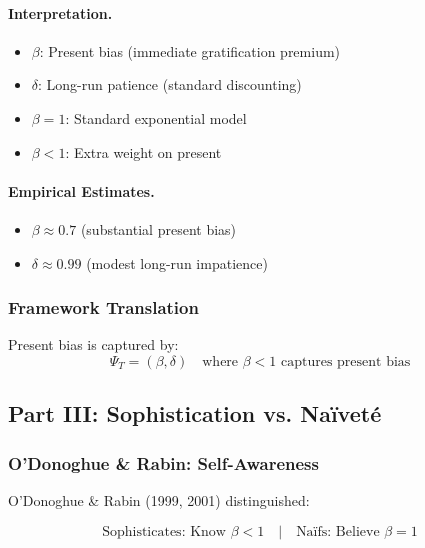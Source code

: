 \paragraph{Interpretation.}
\begin{itemize}
    \item $\beta$: Present bias (immediate gratification premium)
    \item $\delta$: Long-run patience (standard discounting)
    \item $\beta = 1$: Standard exponential model
    \item $\beta < 1$: Extra weight on present
\end{itemize}

\paragraph{Empirical Estimates.}
\begin{itemize}
    \item $\beta \approx 0.7$ (substantial present bias)
    \item $\delta \approx 0.99$ (modest long-run impatience)
\end{itemize}

\subsubsection{Framework Translation}

Present bias is captured by:
\begin{equation}
\Psi_T = (\beta, \delta) \quad \text{where } \beta < 1 \text{ captures present bias}
\end{equation}

\subsection{Part III: Sophistication vs. Naïveté}

\subsubsection{O'Donoghue \& Rabin: Self-Awareness}

O'Donoghue \& Rabin (1999, 2001) distinguished:

\begin{equation}
\boxed{
\text{Sophisticates: Know } \beta < 1 \quad | \quad \text{Naïfs: Believe } \beta = 1
}
\label{eq:sophistication}
\end{equation}

